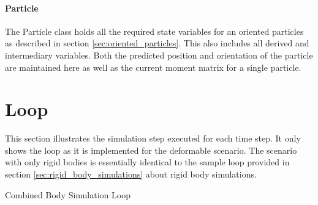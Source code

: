 \paragraph{Particle}
The Particle class holds all the required state variables for an oriented particles as described in section \ref{sec:oriented_particles}. This also includes all derived and intermediary variables. Both the predicted position and orientation of the particle are maintained here as well as the current moment matrix for a single particle.

\section{Loop}

This section illustrates the simulation step executed for each time step. It only shows the loop as it is implemented for the deformable scenario. The scenario with only rigid bodies is essentially identical to the sample loop provided in section \ref{sec:rigid_body_simulations} about rigid body simulations.

\begin{algorithm}[htb!]
\caption{Combined Body Simulation Loop}
\begin{algorithmic}[1]
\ENDFOR
{}
	\ENDFOR
	\ENDFOR
\ENDFOR
{}
		\ENDFOR
	\ENDFOR
\ENDFOR
{}
	\ENDFOR
\ENDFOR
{}
\ENDFOR

\ENDFOR
\end{algorithmic}
\end{algorithm}
